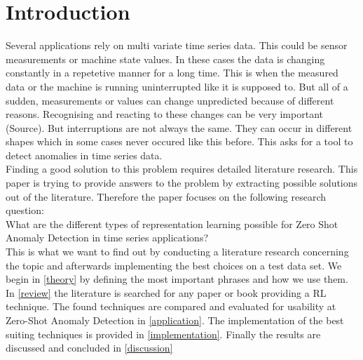 \section{Introduction}\label{intro}
Several applications rely on multi variate time series data. This could be sensor measurements or machine state values. In these cases the data is changing constantly in a repetetive manner for a long time. This is when the measured data or the machine is running uninterrupted like it is supposed to. But all of a sudden, measurements or values can change unpredicted because of different reasons. Recognising and reacting to these changes can be very important (Source). But interruptions are not always the same. They can occur in different shapes which in some cases never occured like this before. This asks for a tool to detect anomalies in time series data.\\
Finding a good solution to this problem requires detailed literature research. This paper is trying to provide answers to the problem by extracting possible solutions out of the literature. Therefore the paper focuses on the following research question:\\
What are the different types of representation learning possible for Zero Shot Anomaly Detection in time series applications?\\
This is what we want to find out by conducting a literature research concerning the topic and afterwards implementing the best choices on a test data set. We begin in \ref{theory} by defining the most important phrases and how we use them. In \ref{review} the literature is searched for any paper or book providing a RL technique. The found techniques are compared and evaluated for usability at Zero-Shot Anomaly Detection in \ref{application}. The implementation of the best suiting techniques is provided in \ref{implementation}. Finally the results are discussed and concluded in \ref{discussion}
